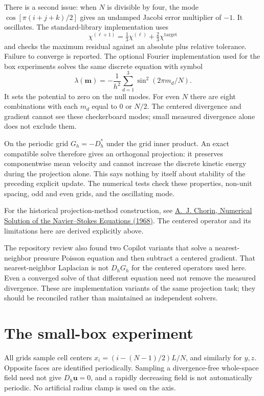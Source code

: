 \documentclass[11pt]{article}
\begin{document}
There is a second issue: when $N$ is divisible by four, the mode
$\cos[\pi(i+j+k)/2]$ gives an undamped Jacobi error multiplier of $-1$.
It oscillates. The standard-library implementation uses
\[
\chi^{(\ell+1)}
=\tfrac13\chi^{(\ell)}+\tfrac23\chi^{\mathrm{target}}
\]
and checks the maximum residual against an absolute plus relative tolerance.
Failure to converge is reported. The optional Fourier implementation used
for the box experiments solves the same discrete equation with symbol
\[
\lambda(\mathbf m)
=-\frac1{h^2}\sum_{d=1}^3\sin^2(2\pi m_d/N).
\]
It sets the potential to zero on the null modes. For even $N$ there are
eight combinations with each $m_d$ equal to $0$ or $N/2$.
The centered divergence and gradient cannot see these checkerboard modes;
small measured divergence alone does not exclude them.

On the periodic grid $G_h=-D_h^*$ under the grid inner product. An exact
compatible solve therefore gives an orthogonal projection: it preserves
componentwise mean velocity and cannot increase the discrete kinetic
energy during the projection alone. This says nothing by itself about
stability of the preceding explicit update.
The numerical tests check these properties, non-unit spacing, odd and even
grids, and the oscillating mode.

For the historical projection-method construction, see
\href{https://math.berkeley.edu/~chorin/chorin68.pdf}
{A.~J. Chorin, Numerical Solution of the Navier--Stokes Equations (1968)}.
The centered operator and its limitations here are derived explicitly above.

The repository review also found two Copilot variants that solve a
nearest-neighbor pressure Poisson equation and then subtract a centered
gradient. That nearest-neighbor Laplacian is not $D_hG_h$ for the centered
operators used here. Even a converged solve of that different equation need
not remove the measured divergence. These are implementation variants of
the same projection task; they should be reconciled rather than maintained
as independent solvers.

\section{The small-box experiment}

All grids sample cell centers
$x_i=(i-(N-1)/2)L/N$, and similarly for $y,z$. Opposite faces are identified
periodically. Sampling a divergence-free whole-space field need not give
$D_h\mathbf u=0$, and a rapidly decreasing field is not automatically periodic.
No artificial radius clamp is used on the axis.
\end{document}
